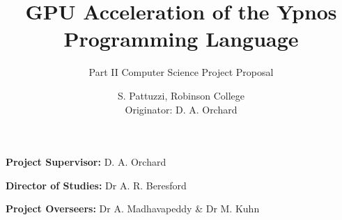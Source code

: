 \documentclass[12pt,a4,parskip=full]{scrartcl}
\begin{document}

\cleardoublepage

\subtitle{Part II Computer Science Project Proposal}
\title{GPU Acceleration of the Ypnos Programming Language}
\author{
S. Pattuzzi, Robinson College\\
Originator: D. A. Orchard
}

\maketitle

\vfill

\noindent
\textbf{Project Supervisor:} D. A. Orchard
\vspace{0.2in}

\noindent
\textbf{Director of Studies:} Dr A. R. Beresford
\vspace{0.2in}
\noindent

\noindent
\textbf{Project Overseers:} Dr A. Madhavapeddy \& Dr M. Kuhn






\end{document}
